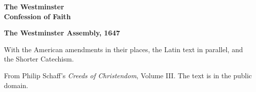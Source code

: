 \documentclass[11pt,letterpaper]{article}
\begin{document}
\color{ink}

\begin{titlepage}
\centering
\vspace*{4em}
{\LARGE\bfseries\color{heading} The Westminster\\[0.3em]Confession of Faith\par}
\vspace{2em}
{\Large\bfseries\color{heading} The Westminster Assembly, 1647\par}
\vspace{2.5em}
{\itshape\color{subhead}\parbox{0.8\linewidth}{\centering With the American amendments in their places, the Latin text in parallel, and the Shorter Catechism.\par}}
\vfill
{\small From Philip Schaff's \emph{Creeds of Christendom}, Volume III. The text is in the public domain.\par}
\vspace{2em}
\end{titlepage}

\tableofcontents


\end{document}
